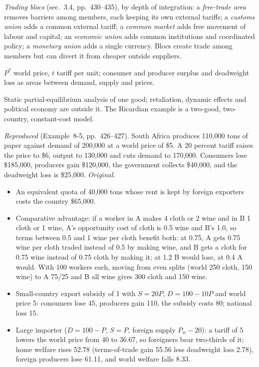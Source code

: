 \begin{qfmethod}
\emph{Trading blocs} (sec.~3.4, pp.~430--435), by depth of integration: a \emph{free-trade area} removes barriers among members, each keeping its own external tariffs; a \emph{customs union} adds a common external tariff; a \emph{common market} adds free movement of labour and capital; an \emph{economic union} adds common institutions and coordinated policy; a \emph{monetary union} adds a single currency. Blocs create trade among members but can divert it from cheaper outside suppliers.

 $P^*$ world price, $t$ tariff per unit; consumer and producer surplus and deadweight loss as areas between demand, supply and prices.

 Static partial-equilibrium analysis of one good; retaliation, dynamic effects and political economy are outside it. The Ricardian example is a two-good, two-country, constant-cost model.

 \emph{Reproduced} (Example~8-5, pp.~426--427). South Africa produces 110,000 tons of paper against demand of 200,000 at a world price of \$5. A 20 percent tariff raises the price to \$6, output to 130,000 and cuts demand to 170,000. Consumers lose \$185,000, producers gain \$120,000, the government collects \$40,000, and the deadweight loss is \$25,000. \emph{Original.}
\begin{itemize}
\item An equivalent quota of 40,000 tons whose rent is kept by foreign exporters costs the country \$65,000.
\item Comparative advantage: if a worker in A makes 4 cloth or 2 wine and in B 1 cloth or 1 wine, A's opportunity cost of cloth is 0.5 wine and B's 1.0, so terms between 0.5 and 1 wine per cloth benefit both: at 0.75, A gets 0.75 wine per cloth traded instead of 0.5 by making wine, and B gets a cloth for 0.75 wine instead of 0.75 cloth by making it; at 1.2 B would lose, at 0.4 A would. With 100 workers each, moving from even splits (world 250 cloth, 150 wine) to A 75/25 and B all wine gives 300 cloth and 150 wine.
\item Small-country export subsidy of 1 with $S=20P$, $D=100-10P$ and world price 5: consumers lose 45, producers gain 110, the subsidy costs 80; national loss 15.
\item Large importer ($D=100-P$, $S=P$, foreign supply $P_w-20$): a tariff of 5 lowers the world price from 40 to 36.67, so foreigners bear two-thirds of it; home welfare rises 52.78 (terms-of-trade gain 55.56 less deadweight loss 2.78), foreign producers lose 61.11, and world welfare falls 8.33.
\end{itemize}


\end{qfmethod}
